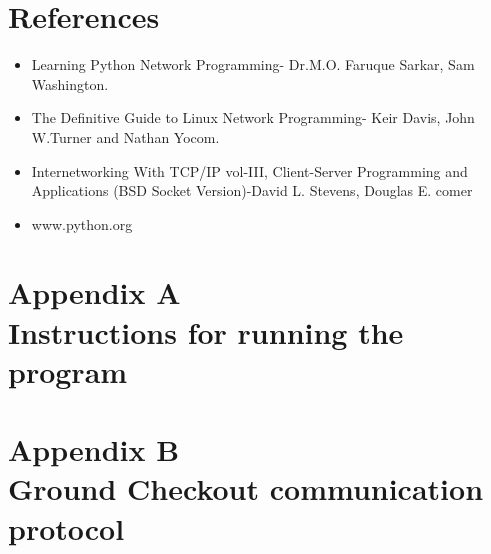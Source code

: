 \documentclass[12pt, a4paper]{report}
\begin{document}
\chapter*{References}
	\begin{itemize}
			\item Learning Python Network Programming- Dr.M.O. Faruque Sarkar, Sam
					Washington.
			\item The Definitive Guide to Linux Network Programming- Keir Davis, John
					W.Turner and Nathan Yocom.
			\item Internetworking With TCP/IP vol-III, Client-Server Programming and
					Applications (BSD Socket Version)-David L. Stevens, Douglas E. comer
			\item www.python.org
	\end{itemize}

\chapter*{Appendix A \\Instructions for running the program}

\chapter*{Appendix B \\Ground Checkout communication protocol}

\end{document}
